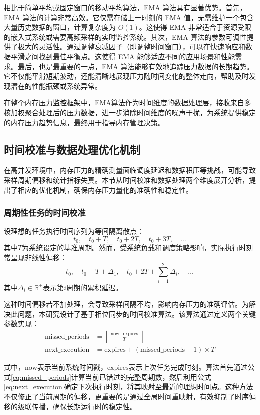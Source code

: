 相比于简单平均或固定窗口的移动平均算法，EMA 算法具有显著优势。首先，EMA 算法的计算非常高效。它仅需存储上一时刻的 EMA 值，无需维护一个包含大量历史数据的窗口，计算复杂度为 \(O(1)\)。这使得 EMA 非常适合于资源受限的嵌入式系统或需要高频采样的实时监控系统。其次，EMA 算法的参数可调性提供了极大的灵活性。通过调整衰减因子（即调整时间窗口），可以在快速响应和数据平滑之间找到最佳平衡点。这使得 EMA 能够适应不同的应用场景和性能需求。最后，也是最重要的一点，EMA 算法能够有效地追踪压力数据的长期趋势。它不仅能平滑短期波动，还能清晰地展现压力随时间变化的整体走向，帮助及时发现潜在的性能瓶颈或系统异常。

在整个内存压力监控框架中，EMA算法作为时间维度的数据处理层，接收来自多核加权聚合处理后的压力数据，进一步消除时间维度的噪声干扰，为系统提供稳定的内存压力趋势信息，最终用于指导内存管理决策。

\subsection{时间校准与数据处理优化机制}
\label{sec:time_calibration_and_data_processing}
在高并发环境中，内存压力的精确测量面临调度延迟和数据积压等挑战，可能导致采样周期偏移和统计指标失真。本节从时间校准和数据处理两个维度展开分析，提出了相应的优化机制，确保内存压力量化的准确性和稳定性。

\subsubsection{周期性任务的时间校准}

设理想的任务执行时间序列为等间隔离散点：
\[
t_0, \quad t_0 + T, \quad t_0 + 2T, \quad t_0 + 3T, \quad \dots
\]
其中\(T\)为系统设定的基准周期。然而，受系统负载和调度策略影响，实际执行时刻常呈现非线性偏移：
\[
t_0, \quad t_0 + T + \Delta_1, \quad t_0 + 2T + \sum_{i=1}^2\Delta_i, \quad \dots
\]
其中\(\Delta_i \in \mathbb{R}^+\)表示第\(i\)周期的累积延迟。

这种时间偏移若不加处理，会导致采样间隔不均，影响内存压力的准确评估。为解决此问题，本研究设计了基于相位同步的时间校准算法。该算法通过定义两个关键参数实现：
\begin{align}
    \text{missed\_periods} &= \left\lfloor \frac{\text{now} - \text{expires}}{T} \right\rfloor
    \label{eq:missed_periods} \\
    \text{next\_execution} &= \text{expires} + (\text{missed\_periods} + 1) \times T
    \label{eq:next_execution}
\end{align}

式中，\(\text{now}\)表示当前系统时间戳，\(\text{expires}\)表示上次任务完成时刻。算法首先通过公式\ref{eq:missed_periods}计算当前已错过的完整周期数，然后利用公式\ref{eq:next_execution}确定下次执行时刻，将其映射至最近的理想时间点。这种方法不仅修正了当前周期的偏移，更重要的是通过全局时间重映射，有效抑制了时序偏移的级联传播，确保长期运行时的稳定性。

